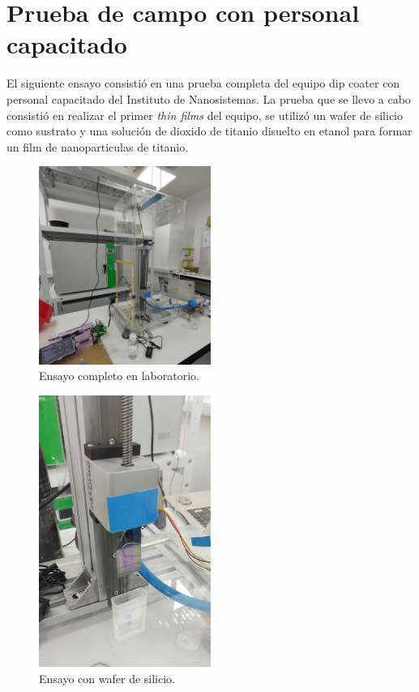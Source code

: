 \section{Prueba de campo con personal capacitado}

El siguiente ensayo consistió en una prueba completa del equipo dip coater con personal capacitado del Instituto de Nanosistemas.
La prueba que se llevo a cabo consistió en realizar el primer \textit{thin films} del equipo, se utilizó un wafer de silicio como sustrato y una solución de dioxido de titanio disuelto en etanol para formar un film de nanoparticulas de titanio.

\begin{figure}[h]
\centering 
\includegraphics[width=0.5\textwidth]{./Figures/prueba_b.jpg}
\caption{Ensayo completo en laboratorio.}
\label{fig:desplazamiento_lineal}
\end{figure}


\begin{figure}[h]
\centering 
\includegraphics[width=0.5\textwidth]{./Figures/prueba_a.jpg}
\caption{Ensayo con wafer de silicio.}
\label{fig:desplazamiento_lineal}
\end{figure}


